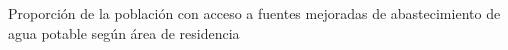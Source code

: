 Proporción de la población con acceso a fuentes mejoradas de abastecimiento de agua potable según área de residencia